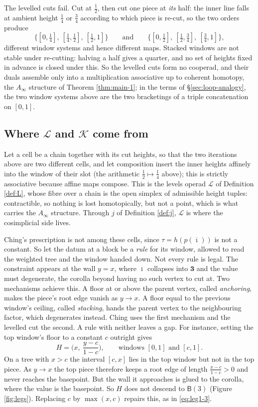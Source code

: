 \documentclass[12pt]{amsart}
\theoremstyle{definition}
\theoremstyle{remark}
\newcommand{\BC}{\mathsf{B}}                     %
\newcommand{\Kop}{\mathcal{K}}                   %
\newcommand{\Lop}{\mathcal{L}}                   %
\begin{document}
The levelled cuts fail. Cut at $\tfrac12$, then cut one piece at \emph{its} half: the inner line falls at ambient height $\tfrac14$ or $\tfrac34$ according to which piece is re-cut, so the two orders produce
\[ \big\{[0,\tfrac14],\ [\tfrac14,\tfrac12],\ [\tfrac12,1]\big\} \quad\quad\text{and}\quad\quad \big\{[0,\tfrac12],\ [\tfrac12,\tfrac34],\ [\tfrac34,1]\big\},\]
different window systems and hence different maps. Stacked windows are not stable under re-cutting: halving a half gives a quarter, and no set of heights fixed in advance is closed under this. So the levelled cuts form no cooperad, and their duals assemble only into a multiplication associative up to coherent homotopy, the $A_\infty$ structure of Theorem \ref{thm:main-1}; in the terms of \S\ref{sec:loop-analogy}, the two window systems above are the two bracketings of a triple concatenation on $[0,1]$.

\subsection*{Where \texorpdfstring{$\Lop$ and $\Kop$}{L and K} come from}
Let a cell be a chain together with its cut heights, so that the two iterations above are two different cells, and let composition insert the inner heights affinely into the window of their slot (the arithmetic $\tfrac12\mapsto\tfrac14$ above); this is strictly associative because affine maps compose. This is the levels operad $\Lop$ of Definition \ref{def:L}, whose fibre over a chain is the open simplex of admissible height tuples: contractible, so nothing is lost homotopically, but not a point, which is what carries the $A_\infty$ structure. Through $j$ of Definition \ref{def:j}, $\Lop$ is where the cosimplicial side lives.

Ching's prescription is not among these cells, since $\tau = h(p(\overline{\imath}))$ is not a constant. So let the datum at a block be a \emph{rule} for its window, allowed to read the weighted tree and the window handed down. Not every rule is legal. The constraint appears at the wall $y=x$, where $\overline{\imath}$ collapses into $\mathbf{3}$ and the value must degenerate, the corolla beyond having no such vertex to cut at. Two mechanisms achieve this. A floor at or above the parent vertex, called \emph{anchoring}, makes the piece's root edge vanish as $y\to x$. A floor equal to the previous window's ceiling, called \emph{stacking}, hands the parent vertex to the neighbouring factor, which degenerates instead. Ching uses the first mechanism and the levelled cut the second. A rule with neither leaves a gap. For instance, setting the top window's floor to a constant $c$ outright gives
\[ H = \Big(x,\ \frac{y-c}{1-c}\Big), \quad\quad \text{windows } [0,1] \text{ and } [c,1].\]
On a tree with $x>c$ the interval $[c,x]$ lies in the top window but not in the top piece. As $y\to x$ the top piece therefore keeps a root edge of length $\tfrac{x-c}{1-c}>0$ and never reaches the basepoint. But the wall it approaches is glued to the corolla, where the value is the basepoint. So $H$ does not descend to $\BC(3)$ (Figure \ref{fig:legs}). Replacing $c$ by $\max(x,c)$ repairs this, as in \eqref{eq:leg1-3}.
\end{document}

